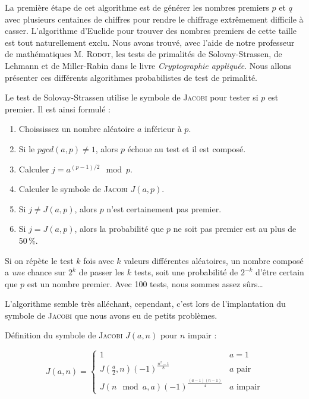\documentclass[a4paper,12pt]{article}
\begin{document}
La première étape de cet algorithme est de générer les nombres premiers $p$ et $q$ avec plusieurs centaines de chiffres pour rendre le chiffrage extrêmement difficile à casser. L'algorithme d'Euclide pour trouver des nombres premiers de cette taille est tout naturellement exclu. Nous avons trouvé, avec l'aide de notre professeur de mathématiques \textsc{M. Rodot}, les tests de primalités de Solovay-Strassen, de Lehmann et de Miller-Rabin dans le livre \textit{Cryptographie appliquée}. Nous allons présenter ces différents algorithmes probabilistes de test de primalité.

Le test de Solovay-Strassen utilise le symbole de \textsc{Jacobi} pour tester si $p$ est premier. Il est ainsi formulé :
\begin{enumerate}
\item Choississez un nombre aléatoire $a$ inférieur à $p$.
\item Si le $pgcd(a,p) \ne 1$, alors $p$ échoue au test et il est composé.
\item Calculer $j = a^{(p - 1) / 2} \mod p$.
\item Calculer le symbole de \textsc{Jacobi} $J(a,p)$.
\item Si $j \ne J(a,p)$, alors $p$ n'est certainement pas premier.
\item Si $j = J(a,p)$, alors la probabilité que $p$ ne soit pas premier est au plus de 50\,\%.
\end{enumerate}

Si on répète le test $k$ fois avec $k$ valeurs différentes aléatoires, un nombre composé a \emph{une} chance sur $2^k$ de passer les $k$ tests, soit une probabilité de $2^{-k}$ d'être certain que $p$ est un nombre premier. Avec 100 tests, nous sommes assez sûrs\dots{}

L'algorithme semble très alléchant, cependant, c'est lors de l'implantation du symbole de \textsc{Jacobi} que nous avons eu de petits problèmes.

Définition du symbole de \textsc{Jacobi} $J(a,n)$ pour $n$ impair :

\begin{displaymath}
J(a,n) =
\left\{
  \begin{array}{cc}
    1 & a = 1 \\
    J\left(\frac{a}{2}, n\right)(- 1)^{\frac{n^2 - 1}{8}} & a \textrm{ pair} \\
    J(n \mod a, a)(- 1)^{\frac{(a - 1) (n - 1)}{4}} & a \textrm{ impair}
  \end{array}
\right.
\end{displaymath}
\end{document}
